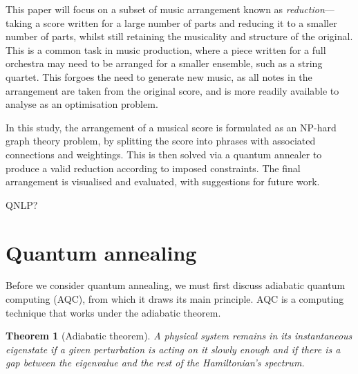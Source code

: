 \documentclass[12pt]{article}
\newtheorem*{theorem}{Theorem}
\theoremstyle{definition}
\begin{document}
This paper will focus on a subset of music arrangement known as \textit{reduction}—taking a score written for a large number of parts and reducing it to a smaller number of parts, whilst still retaining the musicality and structure of the original. This is a common task in music production, where a piece written for a full orchestra may need to be arranged for a smaller ensemble, such as a string quartet. This forgoes the need to generate new music, as all notes in the arrangement are taken from the original score, and is more readily available to analyse as an optimisation problem.

In this study, the arrangement of a musical score is formulated as an NP-hard graph theory problem, by splitting the score into phrases with associated connections and weightings. This is then solved via a quantum annealer to produce a valid reduction according to imposed constraints. The final arrangement is visualised and evaluated, with suggestions for future work.

QNLP?

\section{Quantum annealing}

Before we consider quantum annealing, we must first discuss adiabatic quantum computing (AQC), from which it draws its main principle. AQC is a computing technique that works under the adiabatic theorem.

\begin{theorem}[Adiabatic theorem]
    A physical system remains in its instantaneous eigenstate if a given perturbation is acting on it slowly enough and if there is a gap between the eigenvalue and the rest of the Hamiltonian's spectrum. \cite{born_beweis_1928}
\end{theorem}
\end{document}
